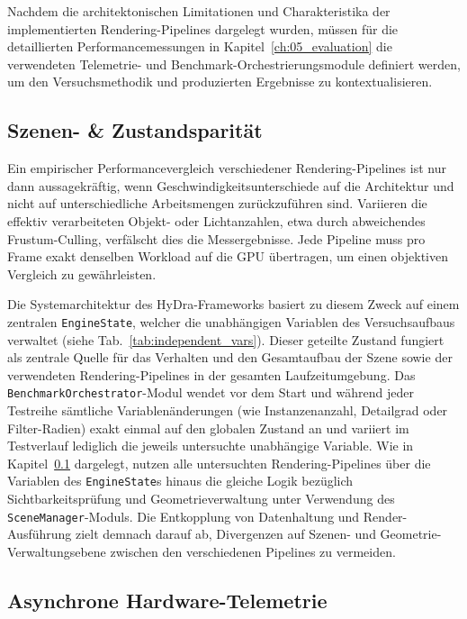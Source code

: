 Nachdem die architektonischen Limitationen und Charakteristika der implementierten Rendering-Pipelines dargelegt wurden,
müssen für die detaillierten Performancemessungen in Kapitel~\ref{ch:05_evaluation} die verwendeten Telemetrie- und
Benchmark-Orchestrierungsmodule definiert werden, um den Versuchsmethodik und produzierten Ergebnisse zu
kontextualisieren.

\subsection{Szenen- \& Zustandsparität}
\label{subsec:040401_scene_and_state_parity}

Ein empirischer Performancevergleich verschiedener Rendering-Pipelines ist nur dann aussagekräftig, wenn
Geschwindigkeitsunterschiede auf die Architektur und nicht auf unterschiedliche Arbeitsmengen zurückzuführen sind.
Variieren die effektiv verarbeiteten Objekt- oder Lichtanzahlen, etwa durch abweichendes Frustum-Culling,
verfälscht dies die Messergebnisse.
Jede Pipeline muss pro Frame exakt denselben Workload auf die \ac{GPU} übertragen, um einen objektiven Vergleich zu
gewährleisten.

Die Systemarchitektur des \ac{HyDra}-Frameworks basiert zu diesem Zweck auf einem zentralen \texttt{EngineState},
welcher die unabhängigen Variablen des Versuchsaufbaus verwaltet (siehe Tab.~\ref{tab:independent_vars}).
Dieser geteilte Zustand fungiert als zentrale Quelle für das Verhalten und den Gesamtaufbau der Szene sowie der
verwendeten Rendering-Pipelines in der gesamten Laufzeitumgebung.
Das \texttt{BenchmarkOrchestrator}-Modul wendet vor dem Start und während jeder Testreihe sämtliche Variablenänderungen
(wie Instanzenanzahl, Detailgrad oder Filter-Radien) exakt einmal auf den globalen Zustand an und variiert im
Testverlauf lediglich die jeweils untersuchte unabhängige Variable.
Wie in Kapitel~\ref{subsec:040401_scene_and_state_parity} dargelegt, nutzen alle untersuchten Rendering-Pipelines über
die Variablen des \texttt{EngineState}s hinaus die gleiche Logik bezüglich Sichtbarkeitsprüfung und
Geometrieverwaltung unter Verwendung des \texttt{SceneManager}-Moduls.
Die Entkopplung von Datenhaltung und Render-Ausführung zielt demnach darauf ab, Divergenzen auf Szenen- und
Geometrie-Verwaltungsebene zwischen den verschiedenen Pipelines zu vermeiden.

\subsection{Asynchrone Hardware-Telemetrie}
\label{subsec:040402_async_hardware_telemetry}

